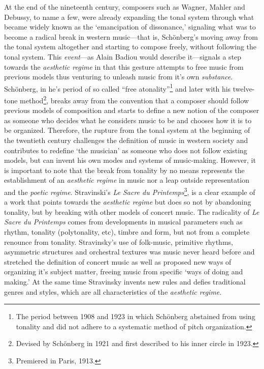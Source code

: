 At the end of the nineteenth century, composers such as Wagner, Mahler and Debussy, to name a few, were already expanding the tonal system through what became widely known as the `emancipation of dissonance,' signaling what was to become a radical break in western music---that is, Sch\"{o}nberg's moving away from the tonal system altogether and starting to compose freely, without following the tonal system. This \emph{event}---as Alain Badiou would describe it---signals a step towards the \emph{aesthetic regime} in that this gesture attempts to free music from previous models thus venturing to unleash music from it's own \emph{substance}. Sch\"{o}nberg, in he's period of so called ``free atonality''\footnote{The period between 1908 and 1923 in which Sch\"{o}nberg abstained from using tonality and did not adhere to a systematic method of pitch organization.} and later with his twelve-tone method\footnote{Devised by Sch\"{o}nberg in 1921 and first described to his inner circle in 1923.}, breaks away from the convention that a composer should follow previous models of composition and starts to define a new notion of the composer as someone who decides what he considers music to be and chooses how it is to be organized. Therefore, the rupture from the tonal system at the beginning of the twentieth century challenges the definition of music in western society and contributes to redefine `the musician' as someone who does not follow existing models, but can invent his own modes and systems of music-making. However, it is important to note that the break from tonality by no means represents the establishment of an \emph{aesthetic regime} in music nor a leap outside representation and the \emph{poetic regime}.  Stravinski's \emph{Le Sacre du Printemps}\footnote{Premiered in Paris, 1913.}, is a clear example of a work that points towards the \emph{aesthetic regime} but does so not by abandoning tonality, but by breaking with other models of concert music. The radicality of \emph{Le Sacre du Printemps} comes from developments in musical parameters such as rhythm, tonality (polytonality, etc), timbre and form, but not from a complete renounce from tonality. Stravinsky's use of folk-music, primitive rhythms, asymmetric structures and orchestral textures was music never heard before and stretched the definition of concert music as well as proposed new ways of organizing it's subject matter, freeing music from specific `ways of doing and making.' At the same time Stravinsky invents new rules and defies traditional genres and styles, which are all characteristics of the \emph{aesthetic regime}. 

